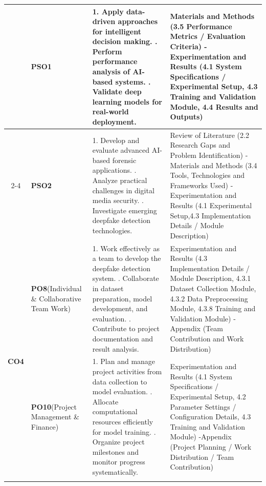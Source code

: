 \documentclass[12pt,a4paper]{report}
\begin{document}
\begin{longtable}{|c|p{2.5cm}|p{7.5cm}|p{4.0cm}|}
& {\textbf{PSO1}}
& 1. Apply data-driven approaches for intelligent decision making.
  \newline 2. Perform performance analysis of AI-based systems.
  \newline 3. Validate deep learning models for real-world deployment.
& Materials and Methods (3.5 Performance Metrics / Evaluation Criteria) -Experimentation and Results (4.1 System Specifications / Experimental Setup, 4.3 Training and Validation Module, 4.4 Results and Outputs) \\ \cline{2-4}

& {\textbf{PSO2}}
& 1. Develop and evaluate advanced AI-based forensic applications.
  \newline 2. Analyze practical challenges in digital media security.
  \newline 3. Investigate emerging deepfake detection technologies.
& Review of Literature (2.2 Research Gaps and Problem Identification) -Materials and Methods (3.4 Tools, Technologies and Frameworks Used) -Experimentation and Results (4.1 Experimental Setup,4.3 Implementation Details / Module Description) \\ \hline

\multirow{3}{*}{\textbf{CO4}}
& {\textbf{PO8}\newline(Individual \& Collaborative Team Work)}
& 1. Work effectively as a team to develop the deepfake detection system.
  \newline 2. Collaborate in dataset preparation, model development, and evaluation.
  \newline 3. Contribute to project documentation and result analysis.
& Experimentation and Results (4.3 Implementation Details / Module Description, 4.3.1 Dataset Collection Module, 4.3.2 Data Preprocessing Module,  4.3.8 Training and Validation Module) -Appendix (Team Contribution and Work Distribution) \\ \cline{2-4}

& {\textbf{PO10}\newline(Project Management \& Finance)}
& 1. Plan and manage project activities from data collection to model evaluation.
  \newline 2. Allocate computational resources efficiently for model training.
  \newline 3. Organize project milestones and monitor progress systematically.
& Experimentation and Results (4.1 System Specifications / Experimental Setup, 4.2 Parameter Settings / Configuration Details, 4.3 Training and Validation Module) -Appendix (Project Planning / Work Distribution / Team Contribution) \\ \cline{2-4}


\end{longtable}
\end{document}
